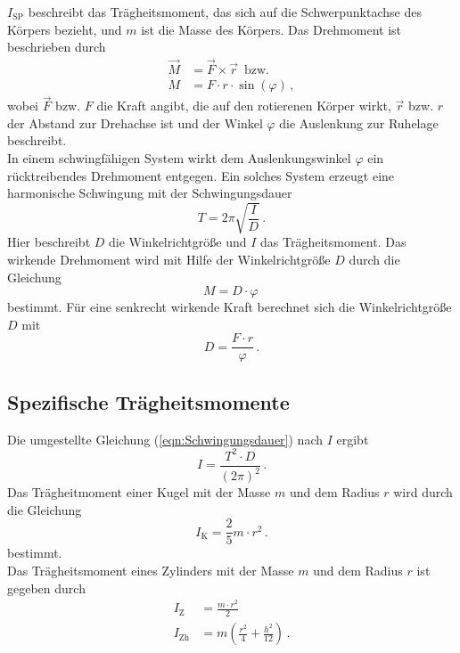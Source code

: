 %
$I_{\text{SP}}$ beschreibt das Trägheitsmoment, das sich auf die Schwerpunktachse des Körpers bezieht, und $m$
ist die Masse des Körpers. 
Das Drehmoment ist beschrieben durch
\begin{align}
    \vec{M} &= \vec{F} \times \vec {r}\, \text{  bzw.} \label{eqn:DrehmomentVektor} \\
    M &= F \cdot r \cdot \sin \left(\varphi \right) \,, \label{eqn:DrehmomentSkalar}
\end{align}
%
wobei $\vec{F}$ bzw. $F$ die Kraft angibt, die auf den rotierenen Körper wirkt, $\vec{r}$ 
bzw. $r$ der Abstand zur Drehachse ist und der Winkel $\varphi$ die Auslenkung zur
Ruhelage beschreibt. \\
In einem schwingfähigen System wirkt dem Auslenkungswinkel $\varphi$ ein rücktreibendes Drehmoment entgegen.
Ein solches System erzeugt eine harmonische Schwingung mit der Schwingungsdauer
\begin{equation}
    T = 2 \pi \sqrt{\frac{I}{D}}\,.
    \label{eqn:Schwingungsdauer}
 \end{equation}
Hier beschreibt $D$ die Winkelrichtgröße und $I$ das Trägheitsmoment.  
Das wirkende Drehmoment wird mit Hilfe der Winkelrichtgröße $D$ durch die Gleichung
\begin{equation}
   M = D \cdot \varphi\,
   \label{eqn:DrehmomentMitWinkelrichtgröße}
\end{equation}
bestimmt. Für eine senkrecht wirkende Kraft berechnet sich die Winkelrichtgröße $D$ mit
\begin{equation}
   D = \frac{F \cdot r}{\varphi}\,.
    \label{eqn:Winkelrichtgröße}
\end{equation}
%
\subsection{Spezifische Trägheitsmomente}
\label{sec:Trägheitsmomente}
Die umgestellte Gleichung (\ref{eqn:Schwingungsdauer}) nach $I$ ergibt
\begin{equation}
    I = \frac{T^{2} \cdot D}{\left(2 \pi\right)^{2}}\,.
    \label{eqn:TragheitmomentAusSchwingungsdauer}
\end{equation}
%
Das Trägheitmoment einer Kugel mit der Masse $m$ und dem Radius $r$ wird durch die Gleichung
\begin{equation}
    I_{\text{K}} = \frac{2}{5}m \cdot r^{2}\,.
    \label{eqn:TragheitKugel}
\end{equation}
bestimmt.\\
Das Trägheitsmoment eines Zylinders mit der Masse $m$ und dem Radius $r$ ist gegeben 
durch
\begin{align}
    I_{\text{Z}} &= \frac{m \cdot r^2}{2} \label{eqn:TragheitZylinder} \\
    I_{\text{Zh}} &= m \left(\frac{r^{2}}{4} + \frac{h^{2}}{12} \right) \label{eqn:TrägheitZylinderQuer}\,.
\end{align}
%
%
